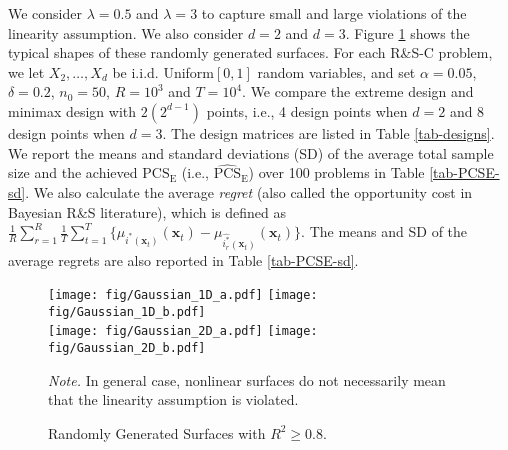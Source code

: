 \documentclass[ijoc,nonblindrev]{informs3}
\def\bx{{\bm x}}
\def\PCSE{\mathrm{PCS}_{\mathrm{E}}}
\def\APCSE{\widehat{\mathrm{PCS}}_{\mathrm{E}}}
\begin{document}
We consider $\lambda=0.5$ and $\lambda=3$ to capture small and large violations of the linearity assumption.
We also consider $d=2$ and $d=3$.
Figure \ref{fig-shape} shows the typical shapes of these randomly generated surfaces.
For each R\&S-C problem, we let $X_2,\ldots,X_{d}$ be i.i.d. \textsf{Uniform}$[0,1]$ random variables, and set $\alpha=0.05$, $\delta=0.2$, $n_0=50$, $R=10^3$ and $T=10^4$.
We compare the extreme design and minimax design with $2(2^{d-1})$ points,
i.e., 4 design points when $d=2$ and 8 design points when $d=3$.
The design matrices are listed in Table \ref{tab-designs}.
We report the means and standard deviations (SD) of the average total sample size and the achieved $\PCSE$ (i.e., $\APCSE$) over 100 problems in Table \ref{tab-PCSE-sd}.
We also calculate the average \emph{regret} (also called the opportunity cost in Bayesian R\&S literature), which is defined as $\frac{1}{R} \sum_{r=1}^R \frac{1}{T} \sum_{t=1}^T \{\mu_{i^*(\bx_t)}(\bx_t) - \mu_{\widehat{i^*_r}(\bx_t)}(\bx_t)\}$.
The means and SD of the average regrets are also reported in Table \ref{tab-PCSE-sd}.

\begin{figure}[p]
\centering
\texttt{[image: fig/Gaussian\_1D\_a.pdf]} \hspace{0.025\textwidth}
\texttt{[image: fig/Gaussian\_1D\_b.pdf]}\\
\vspace{4pt}
\texttt{[image: fig/Gaussian\_2D\_a.pdf]} \hspace{0.01\textwidth}
\texttt{[image: fig/Gaussian\_2D\_b.pdf]}
\caption{Randomly Generated Surfaces with $R^2 \geq 0.8$.} \label{fig-shape}
\begin{minipage}[t]{1\linewidth}
\SingleSpacedXI
\vspace{-1.2em}
\footnotesize{
\emph{Note.} \textsf{In general case, nonlinear surfaces do not necessarily mean that the linearity assumption is violated.}
}
\end{minipage}
\end{figure}
\end{document}
